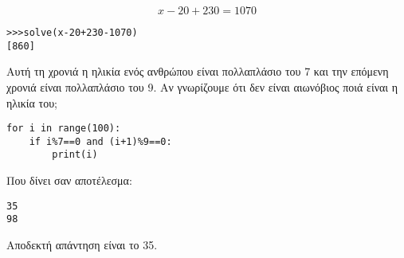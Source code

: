 $$x-20+230=1070$$
\begin{lstlisting}
>>>solve(x-20+230-1070)
[860]
\end{lstlisting}
\begin{exercise}
Αυτή τη χρονιά η ηλικία ενός ανθρώπου είναι πολλαπλάσιο του 7 και την επόμενη
χρονιά είναι πολλαπλάσιο του 9. Αν γνωρίζουμε ότι δεν είναι αιωνόβιος ποιά είναι η
ηλικία του;
\end{exercise}
\begin{lstlisting}
for i in range(100):
    if i%7==0 and (i+1)%9==0:
        print(i)
\end{lstlisting}
Που δίνει σαν αποτέλεσμα:
\begin{lstlisting}
35
98
\end{lstlisting}
Αποδεκτή απάντηση είναι το 35.
